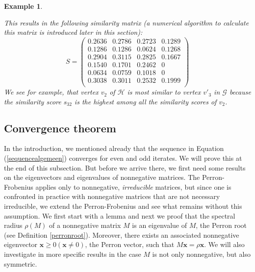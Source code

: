 \documentclass[a4paper,11pt]{report}
\newtheorem{example}[theorem]{Example}
\newcommand{\graf}{\mathscr{G}}
\newcommand{\grafeen}{\mathscr{H}}
\begin{document}
\begin{example}
\begin{center}
\end{center}
This results in the following similarity matrix (a numerical algorithm to calculate this matrix is introduced later
in this section):
$$S = \begin{pmatrix}
0.2636 & 0.2786 & 0.2723 & 0.1289 \\
0.1286 & 0.1286 & 0.0624 & 0.1268 \\
0.2904 & 0.3115 & 0.2825 & 0.1667 \\
0.1540 & 0.1701 & 0.2462 & 0 \\
0.0634 & 0.0759 & 0.1018 & 0 \\
0.3038 & 0.3011 & 0.2532 & 0.1999\\
 \end{pmatrix}$$
 We see for example, that vertex $v_2$ of $\grafeen$ is most similar to
 vertex $v'_3$ in $\graf$  because the similarity score $s_{32}$ 
 is the highest among all the similarity scores of $v_{2}$.
 \end{example}
 
 \subsection{Convergence theorem}
In the introduction, we mentioned already that the sequence in Equation (\ref{sequencealgemeen})
converges for even and odd iterates. We will prove this at the end of this subsection. But before we 
arrive there, we first need some results on the eigenvectors and eigenvalues of nonnegative matrices. 
The Perron-Frobenius applies only to nonnegative, \emph{irreducible} matrices, 
but  since one is confronted in practice 
with nonnegative matrices that are not necessary irreducible,  we extend the Perron-Frobenius and see what remains without this assumption. We 
first start with a lemma and next we proof that the spectral radius $\rho(M)$ of a nonnegative matrix 
$M$ is an eigenvalue of $M$, the Perron root (see Definition \ref{perronroot}). Moreover, there exists an 
associated nonnegative eigenvector $\mathbf{x} \geq 0 (\mathbf{x} \not = 0)$, the Perron vector, such 
that $M\mathbf{x} = \rho\mathbf{x}$.  We will also investigate in more specific 
results in the case $M$ is not only nonnegative, but also symmetric. 
\end{document}
